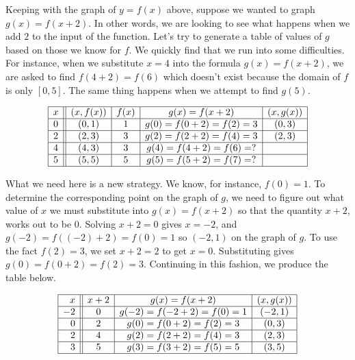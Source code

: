 \documentclass{ximera}
\begin{document}
Keeping with the graph of $y=f(x)$ above, suppose we wanted to graph $g(x) = f(x+2)$.  In other words, we are looking to see what happens when we add $2$ to the input of the function. Let's try to generate a table of values of $g$ based on those we know for $f$.  We quickly find that we run into some difficulties. For instance, when we substitute $x=4$ into the formula $g(x)=f(x+2)$, we are asked to find $f(4+2)=f(6)$ which doesn't exist because the domain of $f$ is only $[0,5]$.  The same thing happens when we attempt to find $g(5)$. 

\[ \begin{array}{|c||c|c|c|c|}  

\hline

x & (x,f(x)) & f(x)& g(x)=f(x+2) & (x, g(x)) \\ \hline
0  & (0,1)& 1 & g(0) = f(0+2) = f(2) = 3   &(0, 3) \\  \hline
2 & (2,3) & 3 & g(2) = f(2+2) = f(4) = 3  &(2,3) \\  \hline
4 & (4,3) & 3 &  g(4) = f(4+2) = f(6) = ? &  \\  \hline
5 & (5,5) & 5 & g(5) = f(5+2) = f(7) = ?  &  \\  \hline

\end{array} \]

 What we need here is a new strategy.  We know, for instance, $f(0) = 1$.  To determine the corresponding point on the graph of $g$, we need to figure out what value of $x$ we must substitute into $g(x) = f(x+2)$ so that the quantity $x+2$, works out to be $0$.  Solving $x+2=0$ gives $x=-2$, and $g(-2) = f((-2)+2) = f(0) = 1$ so  $(-2,1)$ on the graph of $g$.  To use the fact $f(2) = 3$, we set $x+2 = 2$ to get $x=0$. Substituting gives $g(0) = f(0+2) = f(2) = 3$. Continuing in this fashion, we produce the table below.
 
 
\[ \begin{array}{|r||c|c|c|}  

\hline

x & x+2 & g(x)=f(x+2) & (x, g(x)) \\ \hline
-2 & 0 & g(-2)=f(-2+2) = f(0) = 1   &(-2, 1) \\  \hline
0 &  2 &  g(0)=f(0+2) = f(2) = 3  &(0,3) \\  \hline
2 & 4  & g(2)=f(2+2) = f(4) = 3 &  (2,3)\\  \hline
3 & 5 & g(3)=f(3+2) = f(5) = 5  & (3,5) \\  \hline

\end{array} \]
\end{document}
